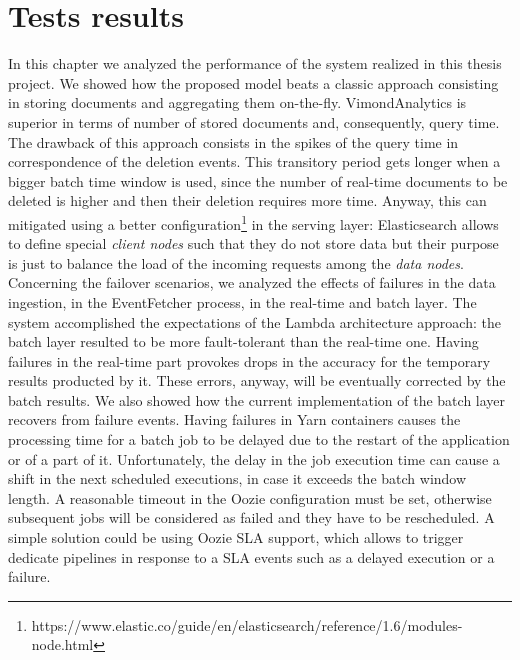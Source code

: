 \section{Tests results}
In this chapter we analyzed the performance of the system realized in this thesis project. We showed how the proposed model beats a classic approach consisting in storing documents and aggregating them on-the-fly. VimondAnalytics is superior in terms of number of stored documents and, consequently, query time. The drawback of this approach consists in the spikes of the query time in correspondence of the deletion events. This transitory period gets longer when a bigger batch time window is used, since the number of real-time documents to be deleted is higher and then their deletion requires more time. Anyway, this can mitigated using a better configuration\footnote{https://www.elastic.co/guide/en/elasticsearch/reference/1.6/modules-node.html} in the serving layer: Elasticsearch allows to define special \textit{client nodes} such that they do not store data but their purpose is just to balance the load of the incoming requests among the \textit{data nodes}.\\
Concerning the failover scenarios, we analyzed the effects of failures in the data ingestion, in the EventFetcher process, in the real-time and batch layer. The system accomplished the expectations of the Lambda architecture approach: the batch layer resulted to be more fault-tolerant than the real-time one. Having failures in the real-time part provokes drops in the accuracy for the temporary results producted by it. These errors, anyway, will be eventually corrected by the batch results. We also showed how the current implementation of the batch layer recovers from failure events. Having failures in Yarn containers causes the processing time for a batch job to be delayed due to the restart of the application or of a part of it. Unfortunately, the delay in the job execution time can cause a shift in the next scheduled executions, in case it exceeds the batch window length. A reasonable timeout in the Oozie configuration must be set, otherwise subsequent jobs will be considered as failed and they have to be rescheduled. A simple solution could be using Oozie SLA support, which allows to trigger dedicate pipelines in response to a SLA events such as a delayed execution or a failure.\\
